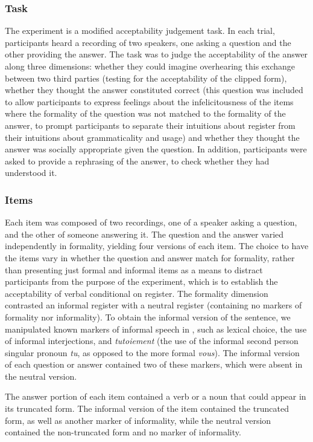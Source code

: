 \documentclass[output=paper,colorlinks,citecolor=brown]{langscibook}
\begin{document}
\subsubsection{Task}
The experiment is a modified acceptability judgement task. In each trial, participants heard a recording of two speakers, one asking a question and the other providing the answer. The task was to judge the acceptability of the answer along three dimensions: whether they could imagine overhearing this exchange between two third parties (testing for the acceptability of the clipped form), whether they thought the answer constituted correct  (this question was included to allow participants to express feelings about the infelicitousness of the items where the formality of the question was not matched to the formality of the answer, to prompt participants to separate their intuitions about register from their intuitions about grammaticality and usage) and whether they thought the answer was socially appropriate given the question. In addition, participants were asked to provide a rephrasing of the answer, to check whether they had understood it.

\subsubsection{Items}

Each item was composed of two recordings, one of a speaker asking a question, and the other of someone answering it. The question and the answer varied independently in formality, yielding four versions of each item. The choice to have the items vary in whether the question and answer match for formality, rather than presenting just formal and informal items as a means to distract participants from the purpose of the experiment, which is to establish the acceptability of verbal  conditional on register. The formality dimension contrasted an informal register with a neutral register (containing no markers of formality nor informality). To obtain the informal version of the sentence, we manipulated known markers of informal speech in , such as lexical choice, the use of informal interjections, and \textit{tutoiement} (the use of the informal second person singular pronoun \textit{tu}, as opposed to the more formal \textit{vous}). The informal version of each question or answer contained two of these markers, which were absent in the neutral version.

The answer portion of each item contained a verb or a noun that could appear in its truncated form. The informal version of the item contained the truncated form, as well as another marker of informality, while the neutral version contained the non-truncated form and no marker of informality. 
\end{document}
